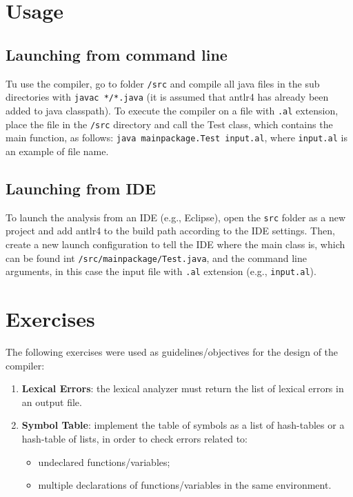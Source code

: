 \documentclass[11pt]{article} %
\begin{document}
\section{Usage}

\subsection{Launching from command line}

Tu use the compiler, go to folder \verb|/src| and compile all java files in the sub directories with \verb|javac */*.java| (it is assumed that antlr4 has already been added to java classpath).
To execute the compiler on a file with \verb|.al| extension, place the file in the \verb|/src| directory and call the Test class, which contains the main function, as follows: \verb|java mainpackage.Test input.al|, where \verb|input.al| is an example of file name.

\subsection{Launching from IDE}
To launch the analysis from an IDE (e.g., Eclipse), open the \verb|src| folder as a new project and add antlr4 to the build path according to the IDE settings. Then, create a new launch configuration to tell the IDE where the main class is, which can be found int \verb|/src/mainpackage/Test.java|, and the command line arguments, in this case the input file with \verb|.al| extension (e.g., \verb|input.al|).

\section{Exercises}
\label{sec:exercices}
The following exercises were used as guidelines/objectives for the design of the compiler:

\begin{enumerate}
\item \textbf{Lexical Errors}: the lexical analyzer must return the list of lexical errors in an output file. 
\item \textbf{Symbol Table}: implement the table of symbols as a list of hash-tables or a hash-table of lists, in order to check errors related to:
\begin{itemize}
\item undeclared functions/variables;
\item multiple declarations of functions/variables in the same environment.
\end{itemize}
\end{enumerate}
\end{document}
